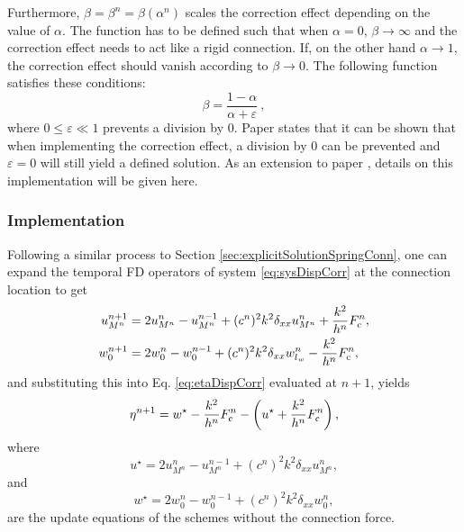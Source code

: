 Furthermore, $\beta = \beta^n = \beta(\alpha^n)$ scales the correction effect depending on the value of $\alpha$. The function has to be defined such that when $\alpha = 0$, $\beta\rightarrow \infty$ and the correction effect needs to act like a rigid connection. If, on the other hand $\alpha \rightarrow 1$, the correction effect should vanish according to $\beta \rightarrow 0$. The following function satisfies these conditions:
\begin{equation}\label{eq:betaDef}
    \beta  = \frac{1-\alpha}{\alpha + \varepsilon}\ ,
\end{equation}
where $0\leq\varepsilon \ll 1$ prevents a division by 0. Paper \citeP[G] states that it can be shown that when implementing the correction effect, a division by 0 can be prevented and $\varepsilon = 0$ will still yield a defined solution. As an extension to paper \citeP[G], details on this implementation will be given here.

\subsubsection{Implementation}
Following a similar process to Section \ref{sec:explicitSolutionSpringConn}, one can expand the temporal FD operators of system \eqref{eq:sysDispCorr} at the connection location to get
\begin{subequations}\label{eq:sysDispCorrNp1}
    \begin{align}
        u_{M^n}^{n+1} &= 2u_{M^n}^{n} - u_{M^n}^{n-1} + (c^n)^2k^2\delta_{xx}u_{M^n}^{n}+ \frac{k^2}{h^n}
        F_\text{c}^n,\\
        w_{0}^{n+1} &= 2w_{0}^{n} - w_0^{n-1} + (c^n)^2k^2\delta_{xx}w_{l_w}^n - \frac{k^2}{h^n}
        F_\text{c}^n,
    \end{align}
\end{subequations}
and substituting this into Eq. \eqref{eq:etaDispCorr} evaluated at $n+1$, yields
\begin{equation}\label{eq:etaNextDispCorr1}
    \eta^{n+1} = w^\star-\frac{k^2}{h^n}F_{\text{c}}^n-\left(u^\star+\frac{k^2}{h^n}F_{\text{c}}^n\right),
\end{equation}
where 
\begin{equation*}
    u^\star = 2u_{M^n}^{n} - u_{M^n}^{n-1} + (c^n)^2k^2\delta_{xx}u_{M^n}^{n},
\end{equation*} 
and 
\begin{equation*}
    w^\star = 2w_{0}^{n} - w_0^{n-1} + (c^n)^2k^2\delta_{xx}w_0^n ,
\end{equation*}
are the update equations of the schemes without the connection force. 

